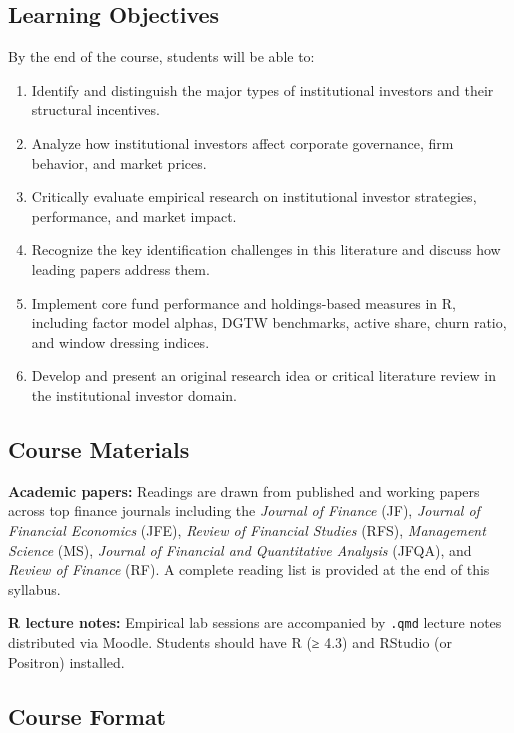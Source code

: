 \documentclass[
  12pt,
  letterpaper,
  DIV=11,
  numbers=noendperiod]{scrartcl}
\providecommand{\tightlist}{%
  \setlength{\itemsep}{0pt}\setlength{\parskip}{0pt}}
\begin{document}
\subsection{Learning Objectives}\label{learning-objectives}

By the end of the course, students will be able to:

\begin{enumerate}
\def\labelenumi{\arabic{enumi}.}
\tightlist
\item
  Identify and distinguish the major types of institutional investors
  and their structural incentives.
\item
  Analyze how institutional investors affect corporate governance, firm
  behavior, and market prices.
\item
  Critically evaluate empirical research on institutional investor
  strategies, performance, and market impact.
\item
  Recognize the key identification challenges in this literature and
  discuss how leading papers address them.
\item
  Implement core fund performance and holdings-based measures in R,
  including factor model alphas, DGTW benchmarks, active share, churn
  ratio, and window dressing indices.
\item
  Develop and present an original research idea or critical literature
  review in the institutional investor domain.
\end{enumerate}

\subsection{Course Materials}\label{course-materials}

\textbf{Academic papers:} Readings are drawn from published and working
papers across top finance journals including the \emph{Journal of
Finance} (JF), \emph{Journal of Financial Economics} (JFE), \emph{Review
of Financial Studies} (RFS), \emph{Management Science} (MS),
\emph{Journal of Financial and Quantitative Analysis} (JFQA), and
\emph{Review of Finance} (RF). A complete reading list is provided at
the end of this syllabus.

\textbf{R lecture notes:} Empirical lab sessions are accompanied by
\texttt{.qmd} lecture notes distributed via Moodle. Students should have
R (≥ 4.3) and RStudio (or Positron) installed.

\subsection{Course Format}\label{course-format}
\end{document}
